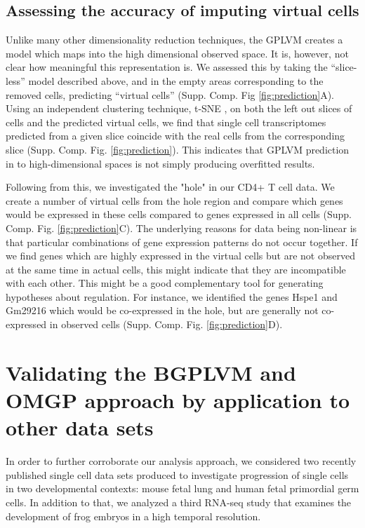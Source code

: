 \subsection{Assessing the accuracy of imputing virtual cells}

Unlike many other dimensionality reduction techniques, the GPLVM creates a model which maps into the high dimensional observed space. It is, however, not clear how meaningful this representation is. We assessed this by taking the ``slice-less'' model described above, and in the empty areas corresponding to the removed cells, predicting ``virtual cells'' (Supp. Comp. Fig \ref{fig:prediction}A). Using an independent clustering technique, t-SNE \cite{Van_der_Maaten2008-lh}, on both the left out slices of cells and the predicted virtual cells, we find that single cell transcriptomes predicted from a given slice coincide with the real cells from the corresponding slice (Supp. Comp. Fig. \ref{fig:prediction}). This indicates that GPLVM prediction in to high-dimensional spaces is not simply producing overfitted results.

Following from this, we investigated the "hole" in our CD4+ T cell data. We create a number of virtual cells from the hole region and compare which genes would be expressed in these cells compared to genes expressed in all cells (Supp. Comp. Fig. \ref{fig:prediction}C). The underlying reasons for data being non-linear is that particular combinations of gene expression patterns do not occur together. If we find genes which are highly expressed in the virtual cells but are not observed at the same time in actual cells, this might indicate that they are incompatible with each other. This might be a good complementary tool for generating hypotheses about regulation. For instance, we identified the genes Hspe1 and Gm29216 which would be co-expressed in the hole, but are generally not co-expressed in observed cells (Supp. Comp. Fig. \ref{fig:prediction}D).

\section{Validating the BGPLVM and OMGP approach by application to other data sets}

In order to further corroborate our analysis approach, we considered two recently published single cell data sets produced to investigate progression of single cells in two developmental contexts: mouse fetal lung and human fetal primordial germ cells. In addition to that, we analyzed a third RNA-seq study that examines the development of frog embryos in a high temporal resolution.


